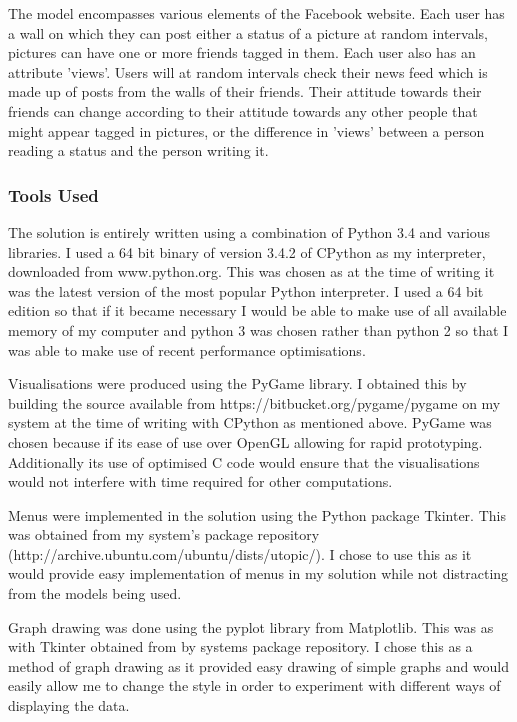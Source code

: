\documentclass[12pt,a4paper]{article}
\begin{document}
The model encompasses various elements of the Facebook website. Each user has a wall on which they can post either a status of a picture at random intervals, pictures can have one or more friends tagged in them. Each user also has an attribute 'views'. Users will at random intervals check their news feed which is made up of posts from the walls of their friends. Their attitude towards their friends can change according to their attitude towards any other people that might appear tagged in pictures, or the difference in 'views' between a person reading a status and the person writing it.

\subsubsection{Tools Used}

The solution is entirely written using a combination of Python 3.4 and various libraries. I used a 64 bit binary of version 3.4.2 of CPython as my interpreter, downloaded from www.python.org. This was chosen as at the time of writing it was the latest version of the most popular Python interpreter. I used a 64 bit edition so that if it became necessary I would be able to make use of all available memory of my computer and python 3 was chosen rather than python 2 so that I was able to make use of recent performance optimisations.

Visualisations were produced using the PyGame library. I obtained this by building the source available from https://bitbucket.org/pygame/pygame on my system at the time of writing with CPython as mentioned above. PyGame was chosen because if its ease of use over OpenGL allowing for rapid prototyping. Additionally its use of optimised C code would ensure that the visualisations would not interfere with time required for other computations.

Menus were implemented in the solution using the Python package Tkinter. This was obtained from my system's package repository (http://archive.ubuntu.com/ubuntu/dists/utopic/). I chose to use this as it would provide easy implementation of menus in my solution while not distracting from the models being used.

Graph drawing was done using the pyplot library from Matplotlib. This was as with Tkinter obtained from by systems package repository. I chose this as a method of graph drawing as it provided easy drawing of simple graphs and would easily allow me to change the style in order to experiment with different ways of displaying the data.
\end{document}
